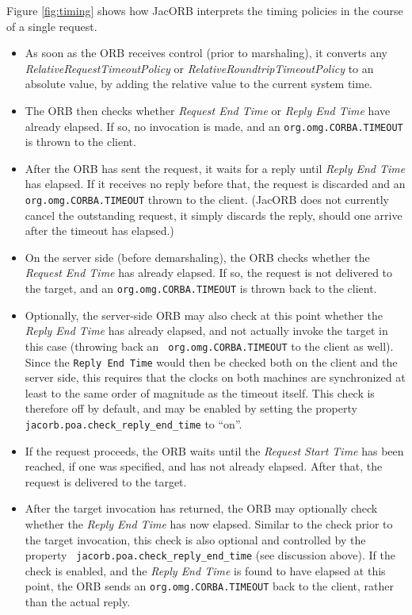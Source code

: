 Figure \ref{fig:timing} shows how JacORB interprets the timing
policies in the course of a single request.

\begin{itemize}
\item As soon as the ORB receives control (prior to marshaling), it
converts any \emph{RelativeRequestTimeoutPolicy} or
\emph{RelativeRoundtripTimeoutPolicy} to an absolute value, by adding
the relative value to the current system time.

\item The ORB then checks whether \emph{Request End Time} or
\emph{Reply End Time} have already elapsed.  If so, no invocation is
made, and an {\tt org.omg.CORBA.TIMEOUT} is thrown to the client.

\item After the ORB has sent the request, it waits for a reply until
\emph{Reply End Time} has elapsed.  If it receives no reply before
that, the request is discarded and an {\tt org.omg.CORBA.TIMEOUT}
thrown to the client.  (JacORB does not currently cancel the
outstanding request, it simply discards the reply, should one arrive
after the timeout has elapsed.)

\item On the server side (before demarshaling), the ORB checks whether
the \emph{Request End Time} has already elapsed.  If so, the request
is not delivered to the target, and an {\tt org.omg.CORBA.TIMEOUT}
is thrown back to the client.

\item Optionally, the server-side ORB may also check at this point
whether the \emph{Reply End Time} has already elapsed, and not
actually invoke the target in this case (throwing back an {\tt
org.omg.CORBA.TIMEOUT} to the client as well).  Since the {\tt Reply
  End Time} would then be checked both on the client and the server
side, this requires that the clocks on both machines are synchronized
at least to the same order of magnitude as the timeout itself.  This
check is therefore off by default, and may be enabled by setting the
property {\tt jacorb.poa.check\_reply\_end\_time} to ``on''.

\item If the request proceeds, the ORB waits until the \emph{Request
Start Time} has been reached, if one was specified, and has not
already elapsed.  After that, the request is delivered to the target.

\item After the target invocation has returned, the ORB may
optionally check whether the \emph{Reply End Time} has now elapsed.
Similar to the check prior to the target invocation, this check is
also optional and controlled by the property {\tt
jacorb.poa.check\_reply\_end\_time} (see discussion above).  If
the check is enabled, and the \emph{Reply End Time} is found to have
elapsed at this point, the ORB sends an {\tt org.omg.CORBA.TIMEOUT}
back to the client, rather than the actual reply.


\end{itemize}
